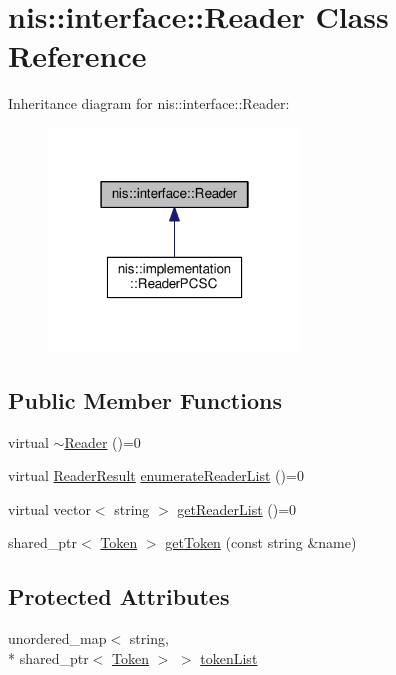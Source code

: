 \hypertarget{classnis_1_1interface_1_1Reader}{\section{nis\-:\-:interface\-:\-:Reader Class Reference}
\label{classnis_1_1interface_1_1Reader}
}


Inheritance diagram for nis\-:\-:interface\-:\-:Reader\-:
\nopagebreak
\begin{figure}[H]
\begin{center}
\leavevmode
\includegraphics[width=190pt]{classnis_1_1interface_1_1Reader__inherit__graph}
\end{center}
\end{figure}
\subsection*{Public Member Functions}
\begin{DoxyCompactItemize}
\item 
virtual \hyperlink{classnis_1_1interface_1_1Reader_aa72c86236a788a73310f1800d06ec3ea}{$\sim$\-Reader} ()=0
\item 
virtual \hyperlink{nis__types_8h_a484156f5b8cf43396c5bbe77226fa8da}{Reader\-Result} \hyperlink{classnis_1_1interface_1_1Reader_abf689da8251ccbf468c495ce9b6eb2e7}{enumerate\-Reader\-List} ()=0
\item 
virtual vector$<$ string $>$ \hyperlink{classnis_1_1interface_1_1Reader_a65d1522165b9660c1c1be260af28cbd0}{get\-Reader\-List} ()=0
\item 
shared\-\_\-ptr$<$ \hyperlink{classnis_1_1interface_1_1Token}{Token} $>$ \hyperlink{classnis_1_1interface_1_1Reader_a8132b33c794255154b626887af4a8795}{get\-Token} (const string \&name)
\end{DoxyCompactItemize}
\subsection*{Protected Attributes}
\begin{DoxyCompactItemize}
\item 
unordered\-\_\-map$<$ string, \\*
shared\-\_\-ptr$<$ \hyperlink{classnis_1_1interface_1_1Token}{Token} $>$ $>$ \hyperlink{classnis_1_1interface_1_1Reader_a42d9beab85b111103582f3297fac667b}{token\-List}
\end{DoxyCompactItemize}



